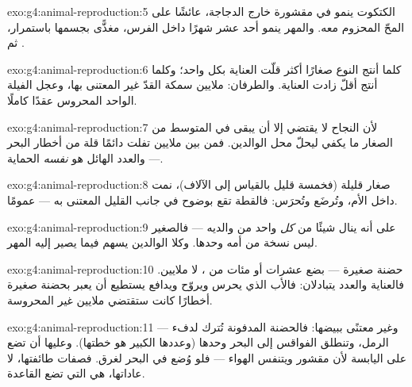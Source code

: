 \begin{solution}{exo:g4:animal-reproduction:5}
الكتكوت ينمو في  مقشورة خارج الدجاجة، عائشًا على المحّ المحزوم
معه. والمهر ينمو أحد عشر شهرًا داخل الفرس، مغذًّى بجسمها باستمرار،
ثم .
\end{solution}

\begin{solution}{exo:g4:animal-reproduction:6}
كلما أنتج النوع صغارًا أكثر قلّت العناية بكل واحد؛ وكلما أنتج أقلّ
زادت العناية. والطرفان: ملايين  سمكة القدّ غير المعتنى بها،
وعجل الفيلة الواحد المحروس عقدًا كاملًا.
\end{solution}

\begin{solution}{exo:g4:animal-reproduction:7}
لأن النجاح لا يقتضي إلا أن يبقى في المتوسط من الصغار ما يكفي ليحلّ
محل الوالدين. فمن بين ملايين  تفلت دائمًا قلة من أخطار البحر
--- والعدد الهائل هو \emph{نفسه} الحماية.
\end{solution}

\begin{solution}{exo:g4:animal-reproduction:8}
صغار قليلة (فخمسة قليل بالقياس إلى الآلاف)، نمت داخل الأم،
وتُرضَع وتُحرَس: فالقطة تقع بوضوح في جانب القليل المعتنى به ---
 عمومًا.
\end{solution}

\begin{solution}{exo:g4:animal-reproduction:9}
على أنه ينال شيئًا من \emph{كل} واحد من والديه --- فالصغير ليس
نسخة من أمه وحدها. وكلا الوالدين يسهم فيما يصير إليه المهر.
\end{solution}

\begin{solution}{exo:g4:animal-reproduction:10}
حضنة صغيرة --- بضع عشرات أو مئات من ، لا ملايين. فالعناية
والعدد يتبادلان: فالأب الذي يحرس ويروّح ويدافع يستطيع أن يعبر
بحضنة صغيرة أخطارًا كانت ستقتضي ملايين  غير المحروسة.
\end{solution}

\begin{solution}{exo:g4:animal-reproduction:11}
 --- وغير معتنًى ببيضها: فالحضنة المدفونة تُترك لدفء الرمل،
وتنطلق الفواقس إلى البحر وحدها (وعددها الكبير هو خطتها). وعليها أن
تضع على اليابسة لأن   مقشور ويتنفس الهواء --- فلو وُضع
في البحر لغرق. فصفات طائفتها، لا عاداتها، هي التي تضع القاعدة.
\end{solution}
